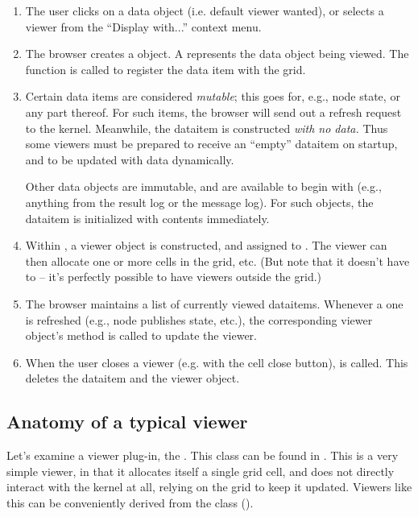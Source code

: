 \documentclass[12pt,twoside]{book}
\begin{document}
  \begin{enumerate} 
  
  \item The user clicks on a data object (i.e. default viewer wanted), or
  selects a viewer from the ``Display with...'' context menu.
  
  \item The browser creates a  object. A  
  represents the data object being viewed. The  
  function is called to register the data item with the grid.
  
  \item Certain data items are considered {\em mutable}; this goes for, e.g.,
  node state, or any part thereof. For such items, the browser will send out a
  refresh request to the kernel. Meanwhile, the dataitem is constructed {\em
  with no data.} Thus some viewers must be prepared to receive an ``empty''
  dataitem on startup, and to be updated with data dynamically.

  Other data objects are immutable, and are available to begin with (e.g.,
  anything from the result log or the message log). For such objects, the
  dataitem is initialized with contents immediately.

  \item Within , a viewer object is constructed, and assigned
  to . The viewer can then allocate one or more cells
  in the grid, etc. (But note that it doesn't have to -- it's perfectly possible
  to have viewers outside the grid.)

  \item The browser maintains a list of currently viewed dataitems. Whenever a
  one is refreshed (e.g., node publishes state, etc.), the corresponding viewer
  object's  method is called to update the viewer.

  \item When the user closes a viewer (e.g. with the cell close button),
   is called. This deletes the dataitem and the
  viewer object.

  \end{enumerate}
  
\subsection{Anatomy of a typical viewer}

  Let's examine a viewer plug-in, the . This class can be found
  in . This is a very simple viewer, in that it
  allocates itself a single grid cell, and does not directly interact with the
  kernel at all, relying on the grid to keep it updated. Viewers like this can
  be conveniently derived from the  class
  (). 
\end{document}
